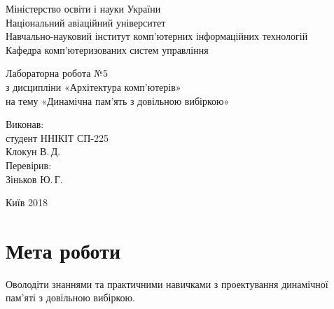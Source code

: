 \documentclass[a4paper, oneside, DIV = 12, 12pt, headings = normal]{scrartcl}
\begin{document}
	\begin{titlepage}
	\centering
		Міністерство освіти і науки України\\
		Національний авіаційний університет\\
		Навчально-науковий інститут комп'ютерних інформаційних технологій\\
		Кафедра комп'ютеризованих систем управління

		\vspace*{\fill}

		Лабораторна робота №5\\
		з дисципліни «Архітектура комп'ютерів»\\
		на тему «Динамічна пам'ять з довільною вибіркою»\\

		\vspace*{\fill}
		
		\begin{flushright}
			Виконав:\\
			студент ННІКІТ СП-225\\
			Клокун В.\,Д.\\
			Перевірив:\\
			Зіньков Ю.\,Г.
		\end{flushright}

		Київ 2018
    \end{titlepage}

		\section{Мета роботи}
			Оволодіти знаннями та практичними навичками з проектування динамічної пам'\-яті з довільною вибіркою.
			
\end{document}

